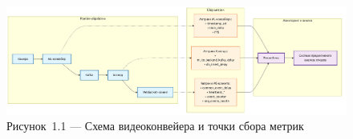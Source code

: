 \begin{landscape}
\vspace*{\fill}
\begin{figure}[H]
	\centering
	\includegraphics[width=\linewidth,height=\textheight,keepaspectratio]{figures/chapter1/video_pipeline_diagram.png}
	\caption*{Рисунок~1.1 --- Схема видеоконвейера и точки сбора метрик}
	\label{fig:video_pipeline}
\end{figure}
\vspace*{\fill}
\end{landscape}
